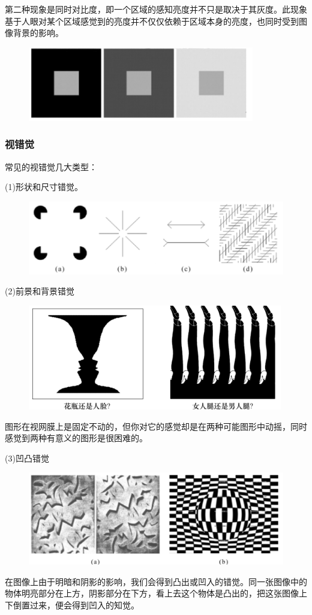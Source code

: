 \documentclass[11pt]{article}
\begin{document}
第二种现象是同时对比度，即一个区域的感知亮度并不只是取决于其灰度。此现象基于人眼对某个区域感觉到的亮度并不仅仅依赖于区域本身的亮度，也同时受到图像背景的影响。
\begin{figure}[h]
	\centering
	\includegraphics[scale=0.5]{6}
\end{figure}
\subsubsection{视错觉}
常见的视错觉几大类型：

(1)形状和尺寸错觉。
\begin{figure}[H]
	\centering
	\includegraphics[scale=0.5]{7}
\end{figure}

(2)前景和背景错觉
\begin{figure}[H]
	\centering
	\includegraphics[scale=0.5]{8}
\end{figure}
图形在视网膜上是固定不动的，但你对它的感觉却是在两种可能图形中动摇，同时感觉到两种有意义的图形是很困难的。

(3)凹凸错觉
\begin{figure}[H]
	\centering
	\includegraphics[scale=0.5]{9}
\end{figure}
在图像上由于明暗和阴影的影响，我们会得到凸出或凹入的错觉。同一张图像中的物体明亮部分在上方，阴影部分在下方，看上去这个物体是凸出的，把这张图像上下倒置过来，便会得到凹入的知觉。
\end{document}
